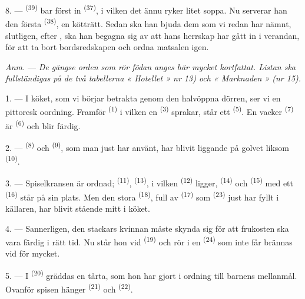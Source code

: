 8. ---  \textsuperscript{(39)} bar först in
 \textsuperscript{(37)}, i vilken det ännu ryker litet soppa.
Nu serverar han den första  \textsuperscript{(38)}, en kötträtt. Sedan ska han
bjuda dem som vi redan har nämnt, slutligen, efter
, ska han begagna sig av att hans herrskap har gått in
i verandan, för att ta bort bordsredskapen och ordna matsalen igen.

\textit{Anm.} --- \textit{De gängse orden som rör födan anges här mycket kortfattat. Listan
ska fullständigas på de två tabellerna « Hotellet » nr 13) och « Marknaden » (nr 15).}

\VUsaut{4.6mm}
\VUsaut{3.0mm}

1. --- I köket, som vi börjar betrakta genom den halvöppna dörren, ser vi en pittoresk
oordning. Framför  \textsuperscript{(1)} i vilken en
 \textsuperscript{(3)} sprakar, står ett 
\textsuperscript{(5)}. En vacker  \textsuperscript{(7)} är
 \textsuperscript{(6)} och blir färdig.

2. ---  \textsuperscript{(8)} och 
\textsuperscript{(9)}, som man just har använt, har blivit liggande på golvet liksom
 \textsuperscript{(10)}.

3. --- Spiselkransen är ordnad;  \textsuperscript{(11)},
 \textsuperscript{(13)}, i vilken 
\textsuperscript{(12)} ligger,  \textsuperscript{(14)} och
 \textsuperscript{(15)} med ett 
\textsuperscript{(16)} står på sin plats. Men den stora 
\textsuperscript{(18)}, full av  \textsuperscript{(17)} som
 \textsuperscript{(23)} just har fyllt i källaren, har blivit
stående mitt i köket.

4. --- Sannerligen, den stackars kvinnan måste skynda sig för att frukosten ska vara färdig i
rätt tid. Nu står hon vid  \textsuperscript{(19)} och rör i en 
\textsuperscript{(24)} som inte får brännas vid för mycket.

5. --- I  \textsuperscript{(20)} gräddas en tårta, som hon har gjort i ordning
till barnens mellanmål. Ovanför spisen hänger  \textsuperscript{(21)} och
 \textsuperscript{(22)}.

